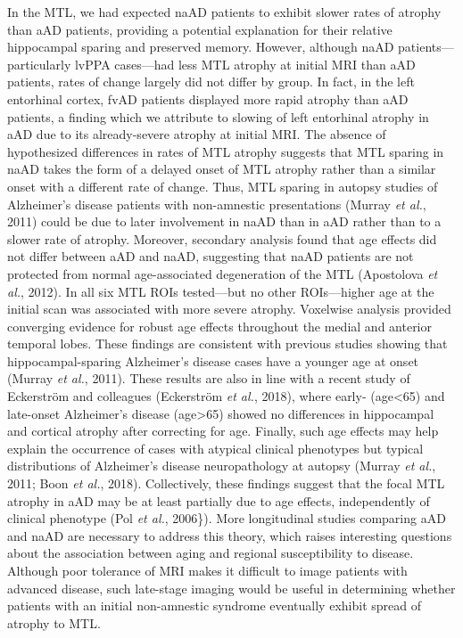 \documentclass[]{article}
\begin{document}
In the MTL, we had expected naAD patients to exhibit slower rates of
atrophy than aAD patients, providing a potential explanation for their
relative hippocampal sparing and preserved memory. However, although
naAD patients---particularly lvPPA cases---had less MTL atrophy at
initial MRI than aAD patients, rates of change largely did not differ by
group. In fact, in the left entorhinal cortex, fvAD patients displayed
more rapid atrophy than aAD patients, a finding which we attribute to
slowing of left entorhinal atrophy in aAD due to its already-severe
atrophy at initial MRI. The absence of hypothesized differences in rates
of MTL atrophy suggests that MTL sparing in naAD takes the form of a
delayed onset of MTL atrophy rather than a similar onset with a
different rate of change. Thus, MTL sparing in autopsy studies of
Alzheimer's disease patients with non-amnestic presentations (Murray
\emph{et al.}, 2011) could be due to later involvement in naAD than in
aAD rather than to a slower rate of atrophy. Moreover, secondary
analysis found that age effects did not differ between aAD and naAD,
suggesting that naAD patients are not protected from normal
age-associated degeneration of the MTL (Apostolova \emph{et al.}, 2012).
In all six MTL ROIs tested---but no other ROIs---higher age at the
initial scan was associated with more severe atrophy. Voxelwise analysis
provided converging evidence for robust age effects throughout the
medial and anterior temporal lobes. These findings are consistent with
previous studies showing that hippocampal-sparing Alzheimer's disease
cases have a younger age at onset (Murray \emph{et al.}, 2011). These
results are also in line with a recent study of Eckerström and
colleagues (Eckerström \emph{et al.}, 2018), where early-
(age\textless{}65) and late-onset Alzheimer's disease
(age\textgreater{}65) showed no differences in hippocampal and cortical
atrophy after correcting for age. Finally, such age effects may help
explain the occurrence of cases with atypical clinical phenotypes but
typical distributions of Alzheimer's disease neuropathology at autopsy
(Murray \emph{et al.}, 2011; Boon \emph{et al.}, 2018). Collectively,
these findings suggest that the focal MTL atrophy in aAD may be at least
partially due to age effects, independently of clinical phenotype (Pol
\emph{et al.}, 2006\}). More longitudinal studies comparing aAD and naAD
are necessary to address this theory, which raises interesting questions
about the association between aging and regional susceptibility to
disease. Although poor tolerance of MRI makes it difficult to image
patients with advanced disease, such late-stage imaging would be useful
in determining whether patients with an initial non-amnestic syndrome
eventually exhibit spread of atrophy to MTL.
\end{document}
